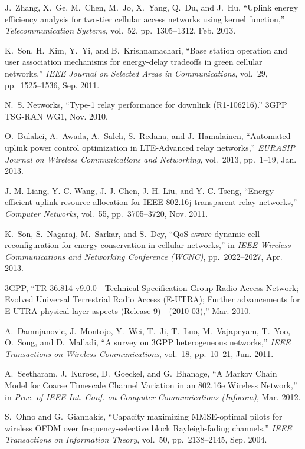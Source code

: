 \documentclass[draftcls,onecolumn]{IEEEtran}
\theoremstyle{plain}
\theoremstyle{definition}
\begin{document}
\begin{thebibliography}{10}
J.~Zhang, X.~Ge, M.~Chen, M.~Jo, X.~Yang, Q.~Du, and J.~Hu, ``Uplink energy
  efficiency analysis for two-tier cellular access networks using kernel
  function,'' {\em Telecommunication Systems}, vol.~52, pp.~1305--1312, Feb.
  2013.

K.~Son, H.~Kim, Y.~Yi, and B.~Krishnamachari, ``Base station operation and user
  association mechanisms for energy-delay tradeoffs in green cellular
  networks,'' {\em IEEE Journal on Selected Areas in Communications}, vol.~29,
  pp.~1525--1536, Sep. 2011.

N.~S. Networks, ``Type-1 relay performance for downlink ({R}1-106216).'' 3GPP
  TSG-RAN WG1, Nov. 2010.

O.~Bulakci, A.~Awada, A.~Saleh, S.~Redana, and J.~Hamalainen, ``Automated
  uplink power control optimization in {LTE}-{A}dvanced relay networks,'' {\em
  EURASIP Journal on Wireless Communications and Networking}, vol.~2013,
  pp.~1--19, Jan. 2013.

J.-M. Liang, Y.-C. Wang, J.-J. Chen, J.-H. Liu, and Y.-C. Tseng,
  ``Energy-efficient uplink resource allocation for {IEEE} 802.16j
  transparent-relay networks,'' {\em Computer Networks}, vol.~55,
  pp.~3705--3720, Nov. 2011.

K.~Son, S.~Nagaraj, M.~Sarkar, and S.~Dey, ``Qo{S}-aware dynamic cell
  reconfiguration for energy conservation in cellular networks,'' in {\em IEEE
  Wireless Communications and Networking Conference (WCNC)}, pp.~2022--2027,
  Apr. 2013.

3GPP, ``{TR 36.814 v9.0.0 - Technical Specification Group Radio Access Network;
  Evolved Universal Terrestrial Radio Access (E-UTRA); Further advancements for
  E-UTRA physical layer aspects (Release 9) - (2010-03)},'' Mar. 2010.

A.~Damnjanovic, J.~Montojo, Y.~Wei, T.~Ji, T.~Luo, M.~Vajapeyam, T.~Yoo,
  O.~Song, and D.~Malladi, ``A survey on 3{GPP} heterogeneous networks,'' {\em
  IEEE Transactions on Wireless Communications}, vol.~18, pp.~10--21, Jun.
  2011.

A.~Seetharam, J.~Kurose, D.~Goeckel, and G.~Bhanage, ``{A Markov Chain Model
  for Coarse Timescale Channel Variation in an 802.16e Wireless Network},'' in
  {\em {Proc. of IEEE Int. Conf. on Computer Communications (Infocom)}}, Mar.
  2012.

S.~Ohno and G.~Giannakis, ``Capacity maximizing {MMSE}-optimal pilots for
  wireless {OFDM} over frequency-selective block {R}ayleigh-fading channels,''
  {\em IEEE Transactions on Information Theory}, vol.~50, pp.~2138--2145, Sep.
  2004.


\end{thebibliography}
\end{document}
